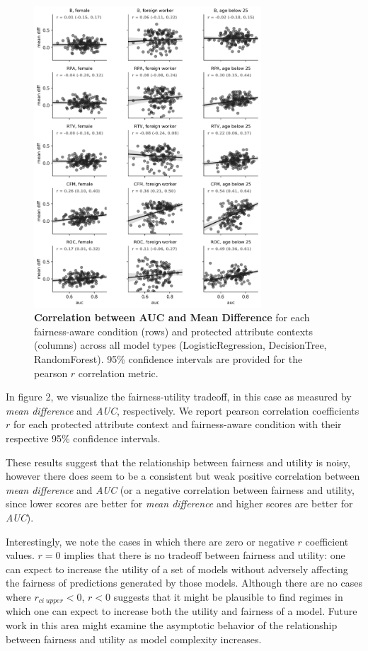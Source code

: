 \documentclass{{interact/interact}}
\begin{document}
\begin{figure}[h]
\centering
\includegraphics[width=8.5cm]{IMG/fairness_utility_tradeoff.png}
\caption{
  \textbf{Correlation between AUC and Mean Difference} for each fairness-aware
  condition (rows) and protected attribute contexts (columns) across all model
  types (LogisticRegression, DecisionTree,   RandomForest). 95\% confidence
  intervals are provided for the pearson \(r\) correlation metric.}
\label{figure-2-fairness-utility-tradeoff}
\end{figure}

In figure 2, we visualize the fairness-utility tradeoff, in this case as
measured by \emph{mean difference} and \emph{AUC}, respectively. We report
pearson correlation coefficients \(r\) for each protected attribute context and
fairness-aware condition with their respective 95\% confidence intervals.

These results suggest that the relationship between fairness and utility is
noisy, however there does seem to be a consistent but weak positive correlation
between \emph{mean difference} and \emph{AUC} (or a negative correlation between
fairness and utility, since lower scores are better for \emph{mean difference}
and higher scores are better for \emph{AUC}).

Interestingly, we note the cases in which there are zero or negative \(r\)
coefficient values. \(r = 0\) implies that there is no tradeoff between fairness
and utility: one can expect to increase the utility of a set of models without
adversely affecting the fairness of predictions generated by those models.
Although there are no cases where \(r_{ci\ upper} < 0\), \(r < 0\) suggests that
it might be plausible to find regimes in which one can expect to increase both
the utility and fairness of a model. Future work in this area might examine the
asymptotic behavior of the relationship between fairness and utility as model
complexity increases.
\end{document}
